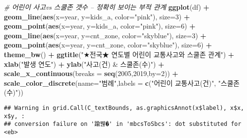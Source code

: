\documentclass[
]{article}
\newenvironment{Shaded}{\begin{snugshade}}{\end{snugshade}}
\newcommand{\CommentTok}[1]{\textcolor[rgb]{0.56,0.35,0.01}{\textit{#1}}}
\newcommand{\DataTypeTok}[1]{\textcolor[rgb]{0.13,0.29,0.53}{#1}}
\newcommand{\DecValTok}[1]{\textcolor[rgb]{0.00,0.00,0.81}{#1}}
\newcommand{\KeywordTok}[1]{\textcolor[rgb]{0.13,0.29,0.53}{\textbf{#1}}}
\newcommand{\NormalTok}[1]{#1}
\newcommand{\OperatorTok}[1]{\textcolor[rgb]{0.81,0.36,0.00}{\textbf{#1}}}
\newcommand{\StringTok}[1]{\textcolor[rgb]{0.31,0.60,0.02}{#1}}
\begin{document}
\begin{Shaded}
\begin{Highlighting}[]
\CommentTok{# 어린이 사고vs 스쿨존 갯수 -- 정확히 보이는 부적 관계}
\KeywordTok{ggplot}\NormalTok{(df) }\OperatorTok{+}
\StringTok{  }\KeywordTok{geom_line}\NormalTok{(}\KeywordTok{aes}\NormalTok{(}\DataTypeTok{x=}\NormalTok{year, }\DataTypeTok{y=}\NormalTok{kids_a, }\DataTypeTok{color=}\StringTok{"pink"}\NormalTok{), }\DataTypeTok{size=}\DecValTok{3}\NormalTok{) }\OperatorTok{+}
\StringTok{  }\KeywordTok{geom_point}\NormalTok{(}\KeywordTok{aes}\NormalTok{(}\DataTypeTok{x=}\NormalTok{year, }\DataTypeTok{y=}\NormalTok{kids_a, }\DataTypeTok{color=}\StringTok{"pink"}\NormalTok{), }\DataTypeTok{size=}\DecValTok{6}\NormalTok{) }\OperatorTok{+}
\StringTok{  }\KeywordTok{geom_line}\NormalTok{(}\KeywordTok{aes}\NormalTok{(}\DataTypeTok{x=}\NormalTok{year, }\DataTypeTok{y=}\NormalTok{cnt_zone, }\DataTypeTok{color=}\StringTok{"skyblue"}\NormalTok{), }\DataTypeTok{size=}\DecValTok{3}\NormalTok{) }\OperatorTok{+}
\StringTok{  }\KeywordTok{geom_point}\NormalTok{(}\KeywordTok{aes}\NormalTok{(}\DataTypeTok{x=}\NormalTok{year, }\DataTypeTok{y=}\NormalTok{cnt_zone, }\DataTypeTok{color=}\StringTok{"skyblue"}\NormalTok{), }\DataTypeTok{size=}\DecValTok{6}\NormalTok{) }\OperatorTok{+}
\StringTok{  }\KeywordTok{theme_bw}\NormalTok{() }\OperatorTok{+}\StringTok{ }
\StringTok{  }\KeywordTok{ggtitle}\NormalTok{(}\StringTok{"★전국★ 연도별 어린이 교통사고와 스쿨존 관계"}\NormalTok{) }\OperatorTok{+}
\StringTok{  }\KeywordTok{xlab}\NormalTok{(}\StringTok{"발생 연도"}\NormalTok{) }\OperatorTok{+}\StringTok{ }\KeywordTok{ylab}\NormalTok{(}\StringTok{"사고(건) & 스쿨존(수)"}\NormalTok{) }\OperatorTok{+}
\StringTok{  }\KeywordTok{scale_x_continuous}\NormalTok{(}\DataTypeTok{breaks =} \KeywordTok{seq}\NormalTok{(}\DecValTok{2005}\NormalTok{,}\DecValTok{2019}\NormalTok{,}\DataTypeTok{by=}\DecValTok{2}\NormalTok{)) }\OperatorTok{+}
\StringTok{  }\KeywordTok{scale_color_discrete}\NormalTok{(}\DataTypeTok{name=}\StringTok{"범례"}\NormalTok{,}\DataTypeTok{labels =} \KeywordTok{c}\NormalTok{(}\StringTok{"어린이 교통사고(건)"}\NormalTok{, }\StringTok{"스쿨존(수)"}\NormalTok{))}
\end{Highlighting}
\end{Shaded}

\begin{verbatim}
## Warning in grid.Call(C_textBounds, as.graphicsAnnot(x$label), x$x, x$y, :
## conversion failure on '踰붾�' in 'mbcsToSbcs': dot substituted for <eb>
\end{verbatim}
\end{document}
